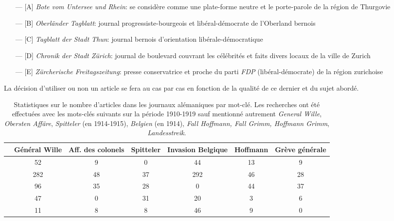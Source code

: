 \documentclass[french,a4paper]{article}
\begin{document}
\begin{itemize}
    \item[---] [A] \textit{Bote vom Untersee und Rhein}: se considère comme une plate-forme neutre et le porte-parole de la région de Thurgovie
    \item[---] [B] \textit{Oberländer Tagblatt}: journal progressiste-bourgeois et libéral-démocrate de l'Oberland bernois
    \item[---] [C] \textit{Tagblatt der Stadt Thun}: journal bernois d'orientation libérale-démocratique
    \item[---] [D] \textit{Chronik der Stadt Zürich}: journal de boulevard couvrant les célébrités et faits divers locaux de la ville de Zurich
    \item[---] [E] \textit{Zürcherische Freitagszeitung}: presse conservatrice et proche du parti \textit{FDP} (libéral-démocrate) de la région zurichoise
\end{itemize}

La décision d'utiliser ou non un article se fera au cas par cas en fonction de la qualité de ce dernier et du sujet abordé.

\begin{table}[h!]
\begin{tabular}{|c|c|c|c|c|c|c|}
\hline
 & Général Wille & Aff. des colonels &  Spitteler & Invasion Belgique &  Hoffmann & Grève générale \\
\hline\hline
 [A] &  52 &  9 &  0 &  44 & 13 &  9 \\
\hline
 [B] & 282 & 48 & 37 & 292 & 46 & 28 \\
\hline
 [C] &  96 & 35 & 28 &   0 & 44 & 37 \\
\hline
 [D] &  47 &  0 & 31 &  20 &  3 &  6 \\
\hline
 [E] &  11 &  8 &  8 &  46 &  9 &  0 \\
\hline
\end{tabular}
\centering
\caption{
Statistiques sur le nombre d'articles dans les journaux alémaniques par mot-clé.
Les recherches ont été effectuées avec les mots-clés suivants sur la période 1910-1919 sauf mentionné autrement \textit{General Wille}, \textit{Obersten Affäre}, \textit{Spitteler} (en 1914-1915), \textit{Belgien} (en 1914), \textit{Fall Hoffmann, Fall Grimm, Hoffmann Grimm}, \textit{Landesstreik}.
}
\end{table}
\end{document}
